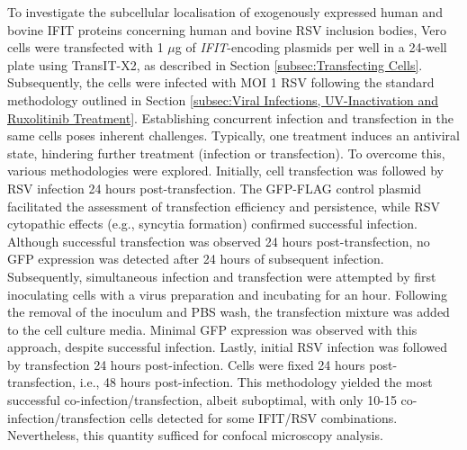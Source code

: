 To investigate the subcellular localisation of exogenously expressed human and bovine IFIT proteins concerning human and bovine RSV inclusion bodies, Vero cells were transfected with 1 \(\mu\)g of \textit{IFIT}-encoding plasmids per well in a 24-well plate using TransIT-X2, as described in Section \ref{subsec:Transfecting Cells}. Subsequently, the cells were infected with MOI 1 RSV following the standard methodology outlined in Section \ref{subsec:Viral Infections, UV-Inactivation and Ruxolitinib Treatment}. Establishing concurrent infection and transfection in the same cells poses inherent challenges. Typically, one treatment induces an antiviral state, hindering further treatment (infection or transfection). To overcome this, various methodologies were explored. Initially, cell transfection was followed by RSV infection 24 hours post-transfection. The GFP-FLAG control plasmid facilitated the assessment of transfection efficiency and persistence, while RSV cytopathic effects (e.g., syncytia formation) confirmed successful infection. Although successful transfection was observed 24 hours post-transfection, no GFP expression was detected after 24 hours of subsequent infection. Subsequently, simultaneous infection and transfection were attempted by first inoculating cells with a virus preparation and incubating for an hour. Following the removal of the inoculum and PBS wash, the transfection mixture was added to the cell culture media. Minimal GFP expression was observed with this approach, despite successful infection. Lastly, initial RSV infection was followed by transfection 24 hours post-infection. Cells were fixed 24 hours post-transfection, i.e., 48 hours post-infection. This methodology yielded the most successful co-infection/transfection, albeit suboptimal, with only 10-15 co-infection/transfection cells detected for some IFIT/RSV combinations. Nevertheless, this quantity sufficed for confocal microscopy analysis.

